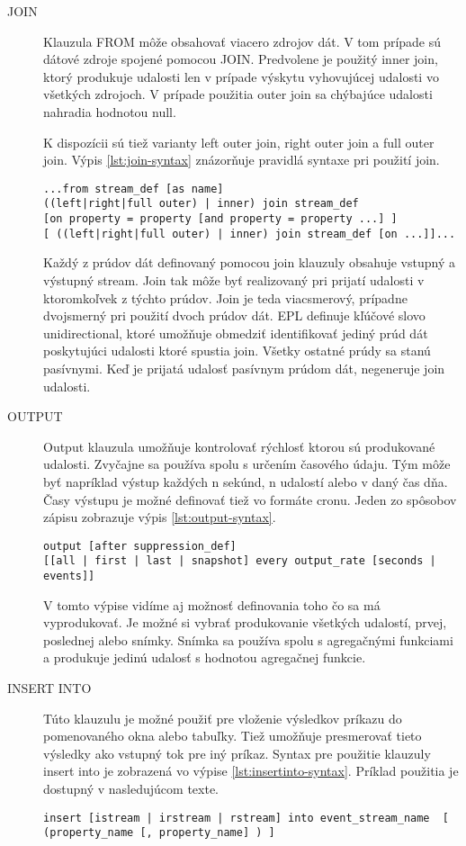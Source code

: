 \begin{description}
			\item[JOIN] Klauzula FROM môže obsahovať viacero zdrojov dát. V tom prípade sú dátové zdroje spojené pomocou JOIN. Predvolene je použitý inner join, ktorý produkuje udalosti len v prípade výskytu vyhovujúcej udalosti vo všetkých zdrojoch. V prípade použitia outer join sa chýbajúce udalosti nahradia hodnotou null.
	
			K dispozícii sú tiež varianty left outer join, right outer join a full outer join. Výpis \ref{lst:join-syntax} znázorňuje pravidlá syntaxe pri použití join.
			\begin{lstlisting}[label=lst:join-syntax]
...from stream_def [as name] 
((left|right|full outer) | inner) join stream_def 
[on property = property [and property = property ...] ]
[ ((left|right|full outer) | inner) join stream_def [on ...]]...
			\end{lstlisting}
			Každý z prúdov dát definovaný pomocou join klauzuly obsahuje vstupný a výstupný stream. Join tak môže byť realizovaný pri prijatí udalosti v ktoromkoľvek z týchto prúdov. Join je teda viacsmerový, prípadne dvojsmerný pri použití dvoch prúdov dát.
			EPL definuje kľúčové slovo unidirectional, ktoré umožňuje obmedziť identifikovať jediný prúd dát poskytujúci udalosti ktoré spustia join. Všetky ostatné prúdy sa stanú pasívnymi. Keď je prijatá udalosť pasívnym prúdom dát, negeneruje join udalosti.
	
			\item[OUTPUT] Output klauzula umožňuje kontrolovať rýchlosť ktorou sú produkované udalosti. Zvyčajne sa používa spolu s určením časového údaju. Tým môže byť napríklad výstup každých n sekúnd, n udalostí alebo v daný čas dňa. Časy výstupu je možné definovať tiež vo formáte cronu. Jeden zo spôsobov zápisu zobrazuje výpis \ref{lst:output-syntax}.
			\begin{lstlisting}[label=lst:output-syntax]
output [after suppression_def] 
[[all | first | last | snapshot] every output_rate [seconds | events]]
			\end{lstlisting}
			V tomto výpise vidíme aj možnosť definovania toho čo sa má vyprodukovať. Je možné si vybrať produkovanie všetkých udalostí, prvej, poslednej alebo snímky. Snímka sa používa spolu s agregačnými funkciami a produkuje jedinú udalosť s hodnotou agregačnej funkcie.

			\item[INSERT INTO] Túto klauzulu je možné použiť pre vloženie výsledkov príkazu do pomenovaného okna alebo tabuľky. Tiež umožňuje presmerovať tieto výsledky ako vstupný tok pre iný príkaz. Syntax pre použitie klauzuly insert into je zobrazená vo výpise \ref{lst:insertinto-syntax}. Príklad použitia je dostupný v nasledujúcom texte.
			\begin{lstlisting}[label=lst:insertinto-syntax]
insert [istream | irstream | rstream] into event_stream_name  [ (property_name [, property_name] ) ]
			\end{lstlisting}
			
		\end{description}

